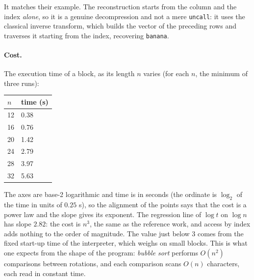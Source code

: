 \noindent
It matches their example. The reconstruction starts from the column and the index
\emph{alone}, so it is a genuine decompression and not a mere \texttt{uncall}: it uses
the classical inverse transform, which builds the vector of the preceding rows
and traverses it starting from the index, recovering \texttt{banana}.

\paragraph{Cost.} The execution time of a block, as its length $n$ varies
(for each $n$, the minimum of three runs):

\begin{center}
\begin{minipage}[c]{0.28\textwidth}
\centering
\begin{tabular}{ll}
\hline
$n$ & time (s)\\
\hline
12 & 0.38\\
16 & 0.76\\
20 & 1.42\\
24 & 2.79\\
28 & 3.97\\
32 & 5.63\\
\hline
\end{tabular}
\end{minipage}%
\hfill
\begin{minipage}[c]{0.66\textwidth}
\centering
\end{minipage}
\end{center}

\noindent
The axes are base-2 logarithmic and time is in seconds (the ordinate is
$\log_2$ of the time in units of $0.25$ s), so the alignment of the points says
that the cost is a power law and the slope gives its exponent. The regression
line of $\log t$ on $\log n$ has slope $2.82$: the cost is $n^3$, the
same as the reference work, and access by index adds nothing to the
order of magnitude. The value just below $3$ comes from the fixed start-up time
of the interpreter, which weighs on small blocks. This is what one expects
from the shape of the program: \emph{bubble sort} performs $O(n^2)$ comparisons between
rotations, and each comparison scans $O(n)$ characters, each read in
constant time.

